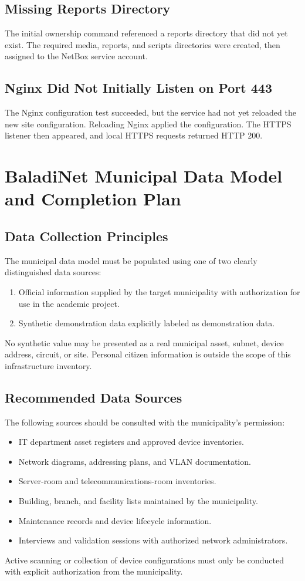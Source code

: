 \documentclass[11pt,a4paper,oneside]{report}
\begin{document}
\section{Missing Reports Directory}
The initial ownership command referenced a reports directory that did not yet exist. The required media, reports, and scripts directories were created, then assigned to the NetBox service account.

\section{Nginx Did Not Initially Listen on Port 443}
The Nginx configuration test succeeded, but the service had not yet reloaded the new site configuration. Reloading Nginx applied the configuration. The HTTPS listener then appeared, and local HTTPS requests returned HTTP 200.

\chapter{BaladiNet Municipal Data Model and Completion Plan}

\section{Data Collection Principles}
The municipal data model must be populated using one of two clearly distinguished data sources:
\begin{enumerate}
  \item Official information supplied by the target municipality with authorization for use in the academic project.
  \item Synthetic demonstration data explicitly labeled as demonstration data.
\end{enumerate}
No synthetic value may be presented as a real municipal asset, subnet, device address, circuit, or site. Personal citizen information is outside the scope of this infrastructure inventory.

\section{Recommended Data Sources}
The following sources should be consulted with the municipality's permission:
\begin{itemize}
  \item IT department asset registers and approved device inventories.
  \item Network diagrams, addressing plans, and VLAN documentation.
  \item Server-room and telecommunications-room inventories.
  \item Building, branch, and facility lists maintained by the municipality.
  \item Maintenance records and device lifecycle information.
  \item Interviews and validation sessions with authorized network administrators.
\end{itemize}
Active scanning or collection of device configurations must only be conducted with explicit authorization from the municipality.
\end{document}
